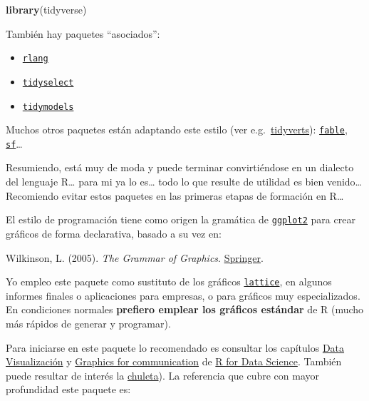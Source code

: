 \documentclass[
]{book}
\newenvironment{Shaded}{\begin{snugshade}}{\end{snugshade}}
\newcommand{\FunctionTok}[1]{\textcolor[rgb]{0.13,0.29,0.53}{\textbf{#1}}}
\newcommand{\NormalTok}[1]{#1}
\providecommand{\tightlist}{%
  \setlength{\itemsep}{0pt}\setlength{\parskip}{0pt}}
\theoremstyle{break}
\theoremstyle{nonumberplain}
\begin{document}
\begin{Shaded}
\begin{Highlighting}[]
\FunctionTok{library}\NormalTok{(tidyverse)}
\end{Highlighting}
\end{Shaded}

También hay paquetes ``asociados'':

\begin{itemize}
\tightlist
\item
  \href{https://rlang.r-lib.org}{\texttt{rlang}}
\item
  \href{https://tidyselect.r-lib.org}{\texttt{tidyselect}}
\item
  \href{https://tidymodels.tidymodels.org}{\texttt{tidymodels}}
\end{itemize}

Muchos otros paquetes están adaptando este estilo (ver e.g.~\href{https://tidyverts.org/}{tidyverts}): \href{https://fable.tidyverts.org}{\texttt{fable}}, \href{https://r-spatial.github.io/sf/}{\texttt{sf}}\ldots{}

Resumiendo, está muy de moda y puede terminar convirtiéndose en un dialecto del lenguaje R\ldots{} para mi ya lo es\ldots{} todo lo que resulte de utilidad es bien venido\ldots{} Recomiendo evitar estos paquetes en las primeras etapas de formación en R\ldots{}

El estilo de programación tiene como origen la gramática de \href{https://ggplot2.tidyverse.org}{\texttt{ggplot2}} para crear gráficos de forma declarativa, basado a su vez en:

Wilkinson, L. (2005). \emph{The Grammar of Graphics}. \href{https://www.google.es/books/edition/The_Grammar_of_Graphics/YGgUswEACAAJ?hl=es}{Springer}.

Yo empleo este paquete como sustituto de los gráficos \href{http://lattice.r-forge.r-project.org/}{\texttt{lattice}}, en algunos informes finales o aplicaciones para empresas, o para gráficos muy especializados.
En condiciones normales \textbf{prefiero emplear los gráficos estándar} de R (mucho más rápidos de generar y programar).

Para iniciarse en este paquete lo recomendado es consultar los capítulos \href{https://r4ds.had.co.nz/data-visualisation.html}{Data Visualización} y \href{https://r4ds.had.co.nz/graphics-for-communication.html}{Graphics for communication} de \href{https://r4ds.had.co.nz}{R for Data Science}.
También puede resultar de interés la \href{https://github.com/rstudio/cheatsheets/blob/master/data-visualization.pdf}{chuleta}).
La referencia que cubre con mayor profundidad este paquete es:
\end{document}
